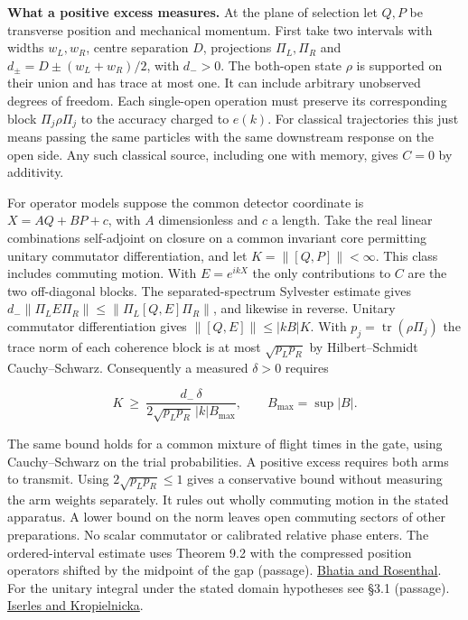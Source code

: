 \documentclass[11pt,a4paper]{article}
\begin{document}
\textbf{What a positive excess measures.} At the plane of selection let
\(Q,P\) be transverse position and mechanical momentum. First take two
intervals with widths \(w_L,w_R\), centre separation \(D\), projections
\(\Pi_L,\Pi_R\) and \(d_\pm=D\pm(w_L+w_R)/2\), with \(d_->0\). The
both-open state \(\rho\) is supported on their union and has trace at
most one. It can include arbitrary unobserved degrees of freedom. Each
single-open operation must preserve its corresponding block
\(\Pi_j\rho\Pi_j\) to the accuracy charged to \(e(k)\). For classical
trajectories this just means passing the same particles with the same
downstream response on the open side. Any such classical source,
including one with memory, gives \(C=0\) by additivity.

For operator models suppose the common detector coordinate is
\(X=AQ+BP+c\), with \(A\) dimensionless and \(c\) a length. Take the
real linear combinations self-adjoint on closure on a common invariant
core permitting unitary commutator differentiation, and let
\(K=\|[Q,P]\|<\infty\). This class includes commuting motion. With
\(E=e^{ikX}\) the only contributions to \(C\) are the two off-diagonal
blocks. The separated-spectrum Sylvester estimate gives
\(d_-\|\Pi_L E\Pi_R\|\le\|\Pi_L[Q,E]\Pi_R\|\), and likewise in reverse.
Unitary commutator differentiation gives \(\|[Q,E]\|\le|kB|K\). With
\(p_j=\operatorname{tr}(\rho\Pi_j)\) the trace norm of each coherence
block is at most \(\sqrt{p_Lp_R}\) by Hilbert--Schmidt Cauchy--Schwarz.
Consequently a measured \(\delta>0\) requires

\[
 K\ \ge\ \frac{d_-\,\delta}{2\sqrt{p_Lp_R}\,|k|B_{\max}},
 \qquad B_{\max}=\sup |B|.
\]

The same bound holds for a common mixture of flight times in the gate,
using Cauchy--Schwarz on the trial probabilities. A positive excess
requires both arms to transmit. Using \(2\sqrt{p_Lp_R}\le1\) gives a
conservative bound without measuring the arm weights separately. It
rules out wholly commuting motion in the stated apparatus. A lower bound
on the norm leaves open commuting sectors of other preparations. No
scalar commutator or calibrated relative phase enters. The
ordered-interval estimate uses Theorem 9.2 with the compressed position
operators shifted by the midpoint of the gap (passage).
\href{https://repository.ias.ac.in/2521/1/2521.pdf\#page=10}{Bhatia and
Rosenthal}. For the unitary integral under the stated domain hypotheses
see §3.1 (passage).
\href{https://arxiv.org/pdf/2401.06635\#page=5}{Iserles and
Kropielnicka}.
\end{document}
